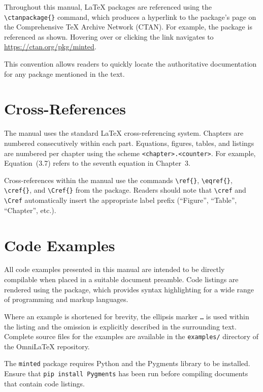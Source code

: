 Throughout this manual, \LaTeX{} packages are referenced using the
\texttt{\textbackslash ctanpackage\{\}} command, which produces a hyperlink to
the package's page on the Comprehensive \TeX{} Archive Network (CTAN).  For
example, the  package is referenced as shown.  Hovering
over or clicking the link navigates to \url{https://ctan.org/pkg/minted}.

This convention allows readers to quickly locate the authoritative
documentation for any package mentioned in the text.

\section{Cross-References}

The manual uses the standard \LaTeX{} cross-referencing system.  Chapters are
numbered consecutively within each part.  Equations, figures, tables, and
listings are numbered per chapter using the scheme
\texttt{<chapter>.<counter>}.  For example, Equation~(3.7) refers to the
seventh equation in Chapter~3.

Cross-references within the manual use the commands
\texttt{\textbackslash ref\{\}}, \texttt{\textbackslash eqref\{\}},
\texttt{\textbackslash cref\{\}}, and \texttt{\textbackslash Cref\{\}} from
the  package.  Readers should note that
\texttt{\textbackslash cref} and \texttt{\textbackslash Cref} automatically
insert the appropriate label prefix (``Figure'', ``Table'', ``Chapter'', etc.).

\section{Code Examples}

All code examples presented in this manual are intended to be directly
compilable when placed in a suitable document preamble.  Code listings are
rendered using the  package, which provides syntax
highlighting for a wide range of programming and markup languages.

Where an example is shortened for brevity, the ellipsis marker
\texttt{\ldots} is used within the listing and the omission is explicitly
described in the surrounding text.  Complete source files for the examples are
available in the \texttt{examples/} directory of the OmniLaTeX repository.

The \texttt{minted} package requires Python and the Pygments library to be
installed.  Ensure that \texttt{pip install Pygments} has been run before
compiling documents that contain code listings.

